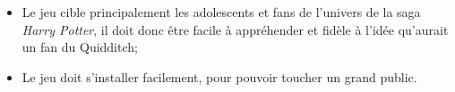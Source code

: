 \begin{itemize}
\item Le jeu cible principalement les adolescents et fans de l'univers de la saga \textit{Harry Potter}, il 
	   doit donc être facile à appréhender et fidèle à l'idée qu'aurait un fan du Quidditch; 
\item Le jeu doit s'installer facilement, pour pouvoir toucher un grand public.
\end{itemize}
